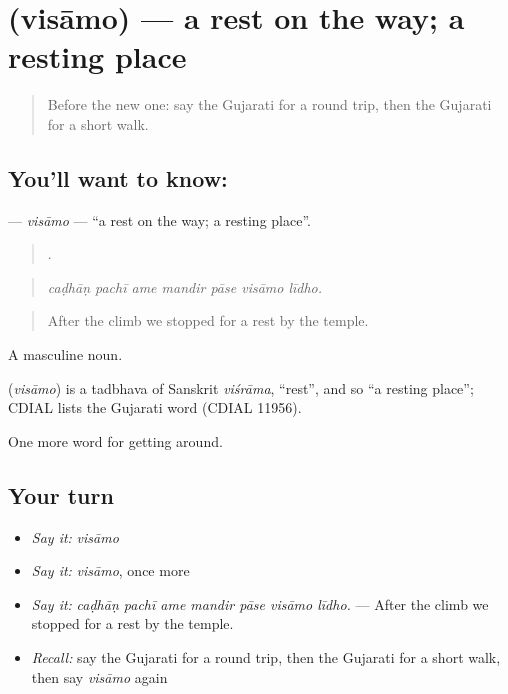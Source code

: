 \section[\texorpdfstring{\gu{વિસામો} (visāmo)}{વિસામો (visāmo)}]{ (visāmo) — a rest on the way; a resting place}

\label{lesson:GU-C408-visamo}



\begin{quote}
Before the new one: say the Gujarati for a round trip, then the Gujarati for a short walk.
\end{quote}

\subsection*{You'll want to know: }
\textbf{} — \emph{visāmo} — \textquotedblleft{}a rest on the way; a resting place\textquotedblright{}.

\begin{quote}
      .
\end{quote}

\begin{quote}
\emph{caḍhāṇ pachī ame mandir pāse visāmo līdho.}
\end{quote}

\begin{quote}
After the climb we stopped for a rest by the temple.
\end{quote}

A masculine noun.

\begin{cousinweb}
\textbf{} (\emph{visāmo}) is a tadbhava of Sanskrit \emph{viśrāma}, \textquotedblleft{}rest\textquotedblright{}, and so \textquotedblleft{}a resting place\textquotedblright{}; CDIAL lists the Gujarati word (CDIAL 11956).
\end{cousinweb}

\begin{grammarlens}[title={What you've built}]
One more word for getting around.
\end{grammarlens}

\subsection*{Your turn}
\begin{itemize}
\raggedright
  \item \emph{Say it:} \emph{visāmo}
  \item \emph{Say it:} \emph{visāmo}, once more
  \item \emph{Say it:} \emph{caḍhāṇ pachī ame mandir pāse visāmo līdho.} — After the climb we stopped for a rest by the temple.
  \item \emph{Recall:} say the Gujarati for a round trip, then the Gujarati for a short walk, then say \emph{visāmo} again
\end{itemize}

